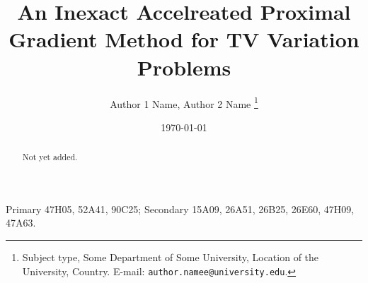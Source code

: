 \documentclass[12pt]{article}
\begin{document}
\title{{\selectfont An Inexact Accelreated Proximal Gradient Method for TV Variation Problems}}

\author{
    Author 1 Name, Author 2 Name
    \thanks{
        Subject type, Some Department of Some University, Location of the University,
        Country. E-mail: \texttt{author.namee@university.edu}.
    }
}

\date{\today}

\maketitle
{}

\begin{abstract} 
    \noindent
    Not yet added. 
\end{abstract}

Primary 47H05, 52A41, 90C25; Secondary 15A09, 26A51, 26B25, 26E60, 47H09, 47A63.

\end{document}
